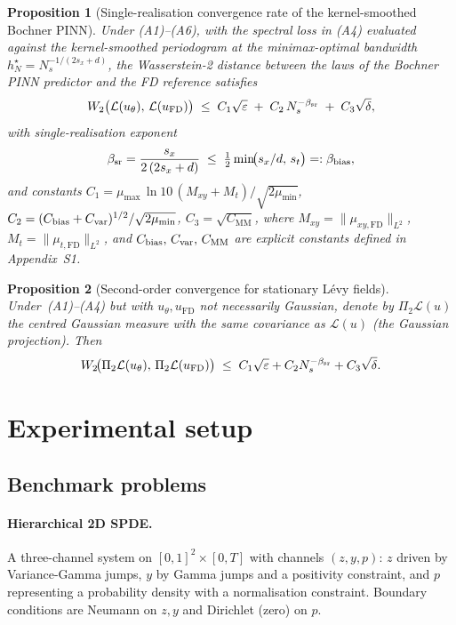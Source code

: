 \documentclass[10pt]{elsarticle}
\newtheorem{proposition}{Proposition}
\begin{document}
\begin{proposition}[Single-realisation convergence rate of the
kernel-smoothed Bochner PINN]
\label{thm:main}
Under (A1)--(A6), with the spectral loss in (A4) evaluated against
the kernel-smoothed periodogram at the minimax-optimal bandwidth
$h_N^\star = N_s^{-1/(2s_x+d)}$, the Wasserstein-2 distance between
the laws of the Bochner PINN predictor and the FD reference satisfies
\begin{equation}
W_2\bigl(\mathcal L(u_\theta),\,\mathcal L(u_{\mathrm{FD}})\bigr)
\;\le\; C_1\sqrt{\varepsilon}
\;+\; C_2\,N_s^{-\beta_{\rm sr}}
\;+\; C_3\sqrt{\delta},
\label{eq:main-bound}
\end{equation}
with single-realisation exponent
\begin{equation}
\beta_{\rm sr} = \frac{s_x}{2\,(2 s_x + d)}
\;\le\;
\tfrac{1}{2}\min\!\bigl(s_x/d,\,s_t\bigr) =: \beta_{\rm bias},
\end{equation}
and constants
\(C_1 = \mu_{\max}\,\ln 10\,(M_{xy}+M_t) / \sqrt{2\mu_{\min}}\),
\(C_2 = (C_{\rm bias}+C_{\rm var})^{1/2}/\sqrt{2\mu_{\min}}\),
\(C_3 = \sqrt{C_{\mathrm{MM}}}\), where
\(M_{xy} = \|\mu_{xy,\mathrm{FD}}\|_{L^2}\),
\(M_t = \|\mu_{t,\mathrm{FD}}\|_{L^2}\), and
\(C_{\rm bias},\,C_{\rm var},\,C_{\mathrm{MM}}\) are explicit constants
defined in Appendix~S1.
\end{proposition}
\begin{proposition}[Second-order convergence for stationary
L\'evy fields]\label{thm:levy-ext}
Under~(A1)--(A4) but with $u_\theta,u_{\mathrm{FD}}$ not necessarily
Gaussian, denote by $\Pi_2\mathcal L(u)$ the centred Gaussian measure
with the same covariance as $\mathcal L(u)$ (the Gaussian projection).
Then
\[
W_2\!\bigl(\Pi_2\mathcal L(u_\theta),\,
\Pi_2\mathcal L(u_{\mathrm{FD}})\bigr)
\;\le\; C_1\sqrt{\varepsilon} + C_2 N_s^{-\beta_{\rm sr}} + C_3\sqrt\delta.
\]
\end{proposition}
\section{Experimental setup}
\label{sec:setup}

\subsection{Benchmark problems}
\label{subsec:problems}

\paragraph{Hierarchical 2D SPDE.}
A three-channel system on \([0,1]^2 \times [0, T]\) with channels
\((z, y, p)\): \(z\) driven by Variance-Gamma jumps, \(y\) by
Gamma jumps and a positivity constraint, and \(p\) representing a
probability density with a normalisation constraint. Boundary
conditions are Neumann on \(z, y\) and Dirichlet (zero) on \(p\).
\end{document}
